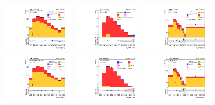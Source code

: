 \begin{figure}[tbp]
  \begin{center}
    \includegraphics[width=0.31\textwidth]{figures/hhMt_mm_CRDY_FullPostfit_plot_nov16_2_radion.pdf}
    \includegraphics[width=0.31\textwidth]{figures/hhMt_mm_CRTT_FullPostfit_plot_nov16_2_radion.pdf}
    \includegraphics[width=0.31\textwidth]{figures/hhMt_mm_SR_FullPostfit_plot_nov16_2_radion.pdf} \\
    \includegraphics[width=0.31\textwidth]{figures/hhMt_ee_CRDY_FullPostfit_plot_nov16_2_radion.pdf}
    \includegraphics[width=0.31\textwidth]{figures/hhMt_ee_CRTT_FullPostfit_plot_nov16_2_radion.pdf}
    \includegraphics[width=0.31\textwidth]{figures/hhMt_ee_SR_FullPostfit_plot_nov16_2_radion.pdf}

\end{center}
\end{figure}
